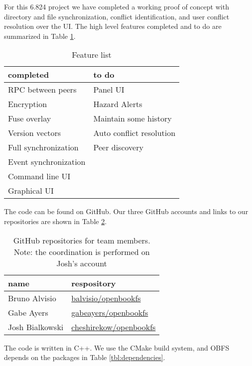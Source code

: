 \documentclass[10pt,twocolumn]{article}
\begin{document}
For this 6.824 project we have completed a working proof of concept with 
directory and file synchronization, conflict identification, and user
conflict resolution over the UI. The high level features completed and to do
are summarized in Table \ref{tbl:FeatureList}.


\begin{table}[ht]
    \centering
    \begin{tabular}{l|l}
        \textbf{completed}      &   \textbf{to do}  \\ \hline
        RPC between peers       &   Panel UI        \\
        Encryption              &   Hazard Alerts   \\
        Fuse overlay            &   Maintain some history   \\
        Version vectors         &   Auto conflict resolution   \\
        Full synchronization    &   Peer discovery          \\
        Event synchronization   &\\
        Command line UI         &\\
        Graphical UI            
    \end{tabular}
    \caption{Feature list}
    \label{tbl:FeatureList}
\end{table}

The code can be found on GitHub. Our three GitHub accounts and links to 
our repositories are shown in Table \ref{tbl:github}. 

\begin{table}[ht]
    \centering
    \begin{tabular}{l|l}
        \textbf{name}     &  \textbf{respository}    \\ \hline
        Bruno Alvisio     &  \url{balvisio/openbookfs}    \\
        Gabe  Ayers       &  \url{gabeayers/openbookfs}   \\
        Josh  Bialkowski  &  \url{cheshirekow/openbookfs} \\
    \end{tabular}
    \caption{GitHub repositories for team members. Note: the coordination is 
             performed on Josh's account}
    \label{tbl:github}
\end{table}


The code is written in C++. We use the CMake build system, and OBFS depends on
the packages in Table \ref{tbl:dependencies}.
\end{document}
